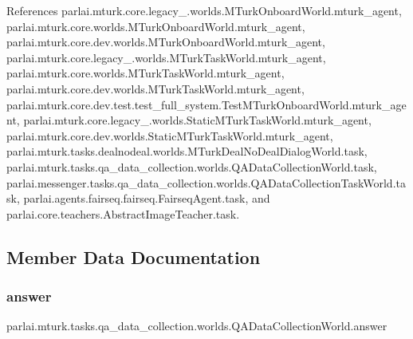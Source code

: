 References parlai.\+mturk.\+core.\+legacy\+\_.\+worlds.\+M\+Turk\+Onboard\+World.\+mturk\+\_\+agent, parlai.\+mturk.\+core.\+worlds.\+M\+Turk\+Onboard\+World.\+mturk\+\_\+agent, parlai.\+mturk.\+core.\+dev.\+worlds.\+M\+Turk\+Onboard\+World.\+mturk\+\_\+agent, parlai.\+mturk.\+core.\+legacy\+\_.\+worlds.\+M\+Turk\+Task\+World.\+mturk\+\_\+agent, parlai.\+mturk.\+core.\+worlds.\+M\+Turk\+Task\+World.\+mturk\+\_\+agent, parlai.\+mturk.\+core.\+dev.\+worlds.\+M\+Turk\+Task\+World.\+mturk\+\_\+agent, parlai.\+mturk.\+core.\+dev.\+test.\+test\+\_\+full\+\_\+system.\+Test\+M\+Turk\+Onboard\+World.\+mturk\+\_\+agent, parlai.\+mturk.\+core.\+legacy\+\_.\+worlds.\+Static\+M\+Turk\+Task\+World.\+mturk\+\_\+agent, parlai.\+mturk.\+core.\+dev.\+worlds.\+Static\+M\+Turk\+Task\+World.\+mturk\+\_\+agent, parlai.\+mturk.\+tasks.\+dealnodeal.\+worlds.\+M\+Turk\+Deal\+No\+Deal\+Dialog\+World.\+task, parlai.\+mturk.\+tasks.\+qa\+\_\+data\+\_\+collection.\+worlds.\+Q\+A\+Data\+Collection\+World.\+task, parlai.\+messenger.\+tasks.\+qa\+\_\+data\+\_\+collection.\+worlds.\+Q\+A\+Data\+Collection\+Task\+World.\+task, parlai.\+agents.\+fairseq.\+fairseq.\+Fairseq\+Agent.\+task, and parlai.\+core.\+teachers.\+Abstract\+Image\+Teacher.\+task.



\subsection{Member Data Documentation}
\mbox{\label{classparlai_1_1mturk_1_1tasks_1_1qa__data__collection_1_1worlds_1_1QADataCollectionWorld_ac49d32ed1e55930adf70fb5c60adc7e0}} 
\subsubsection{\texorpdfstring{answer}{answer}}
{\footnotesize\ttfamily parlai.\+mturk.\+tasks.\+qa\+\_\+data\+\_\+collection.\+worlds.\+Q\+A\+Data\+Collection\+World.\+answer}



